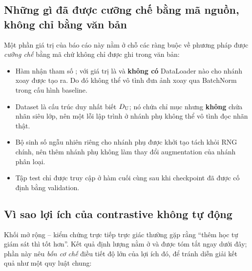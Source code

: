\subsection{Những gì đã được cưỡng chế bằng mã nguồn, không chỉ bằng văn bản}
\label{sec:disc-enforced}

Một phần giá trị của báo cáo này nằm ở chỗ các ràng buộc về phương pháp được \emph{cưỡng chế}
bằng mã chứ không chỉ được ghi trong văn bản:

\begin{itemize}[leftmargin=1.2cm,itemsep=3pt]
  \item Hàm  nhận tham số ; với  giá
        trị là  và \textbf{không có} DataLoader nào cho nhánh xoay được tạo ra.
        Do đó không thể vô tình đưa ảnh xoay qua BatchNorm trong cấu hình baseline.
  \item Dataset  là cấu trúc duy nhất biết $D_{\mathrm{U}}$; nó chứa chỉ mục
        nhưng \textbf{không} chứa nhãn siêu lớp, nên một lỗi lập trình ở nhánh phụ không thể
        vô tình đọc nhãn thật.
  \item Bộ sinh số ngẫu nhiên riêng cho nhánh phụ được khởi tạo tách khỏi RNG chính, nên thêm
        nhánh phụ không làm thay đổi augmentation của nhánh phân loại.
  \item Tập test chỉ được truy cập ở hàm  cuối cùng sau khi checkpoint đã được
        cố định bằng validation.
\end{itemize}

\subsection{Vì sao lợi ích của contrastive không tự động}

Khối mở rộng -- kiểm chứng trực tiếp trực giác thường gặp rằng
\enquote{thêm học tự giám sát thì tốt hơn}. Kết quả định lượng nằm ở 
và được tóm tắt ngay dưới đây; phần này nêu \emph{bốn cơ chế} điều tiết độ lớn của lợi ích đó,
để tránh diễn giải kết quả như một quy luật chung:

